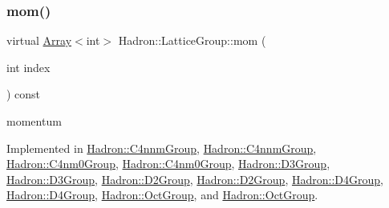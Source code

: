 \mbox{\label{structHadron_1_1LatticeGroup_ad577b65041dd9a6e84b1f3bd49cb8fce}} 
\subsubsection{\texorpdfstring{mom()}{mom()}\hspace{0.1cm}{\footnotesize\ttfamily [1/2]}}
{\footnotesize\ttfamily virtual \mbox{\hyperlink{classXMLArray_1_1Array}{Array}}$<$int$>$ Hadron\+::\+Lattice\+Group\+::mom (\begin{DoxyParamCaption}\item[{int}]{index }\end{DoxyParamCaption}) const\hspace{0.3cm}{\ttfamily [pure virtual]}}

momentum 

Implemented in \mbox{\hyperlink{structHadron_1_1C4nnmGroup_a7553c7f91a8dc310b37b7b5da32e98f6}{Hadron\+::\+C4nnm\+Group}}, \mbox{\hyperlink{structHadron_1_1C4nnmGroup_a7553c7f91a8dc310b37b7b5da32e98f6}{Hadron\+::\+C4nnm\+Group}}, \mbox{\hyperlink{structHadron_1_1C4nm0Group_a45599b94fa4633619247f4827e03ca23}{Hadron\+::\+C4nm0\+Group}}, \mbox{\hyperlink{structHadron_1_1C4nm0Group_a45599b94fa4633619247f4827e03ca23}{Hadron\+::\+C4nm0\+Group}}, \mbox{\hyperlink{structHadron_1_1D3Group_a5662028a7fb3554c893609148e6d3eeb}{Hadron\+::\+D3\+Group}}, \mbox{\hyperlink{structHadron_1_1D3Group_a5662028a7fb3554c893609148e6d3eeb}{Hadron\+::\+D3\+Group}}, \mbox{\hyperlink{structHadron_1_1D2Group_a65d28ef1fef635e870d60b6606b65f19}{Hadron\+::\+D2\+Group}}, \mbox{\hyperlink{structHadron_1_1D2Group_a65d28ef1fef635e870d60b6606b65f19}{Hadron\+::\+D2\+Group}}, \mbox{\hyperlink{structHadron_1_1D4Group_aeb999dc93b1a1a99ed4ffd53977a163b}{Hadron\+::\+D4\+Group}}, \mbox{\hyperlink{structHadron_1_1D4Group_aeb999dc93b1a1a99ed4ffd53977a163b}{Hadron\+::\+D4\+Group}}, \mbox{\hyperlink{structHadron_1_1OctGroup_ab3c3d81d578cac614b1ccdd456f8ea59}{Hadron\+::\+Oct\+Group}}, and \mbox{\hyperlink{structHadron_1_1OctGroup_ab3c3d81d578cac614b1ccdd456f8ea59}{Hadron\+::\+Oct\+Group}}.

\mbox{\label{structHadron_1_1LatticeGroup_ad577b65041dd9a6e84b1f3bd49cb8fce}} 
